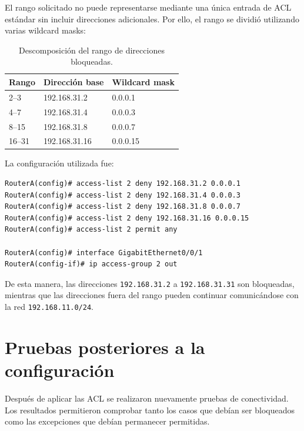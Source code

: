 \documentclass[12pt]{article}
\begin{document}
El rango solicitado no puede representarse mediante una única entrada de ACL
estándar sin incluir direcciones adicionales. Por ello, el rango se dividió
utilizando varias wildcard masks:

\begin{table}[H]
    \centering
    \caption{Descomposición del rango de direcciones bloqueadas.}
    \label{tab:rango}
    \small
    \begin{tabular}{lll}
        \toprule
        \textbf{Rango} & \textbf{Dirección base} & \textbf{Wildcard mask} \\
        \midrule
        2--3 & 192.168.31.2 & 0.0.0.1 \\
        4--7 & 192.168.31.4 & 0.0.0.3 \\
        8--15 & 192.168.31.8 & 0.0.0.7 \\
        16--31 & 192.168.31.16 & 0.0.0.15 \\
        \bottomrule
    \end{tabular}
\end{table}

La configuración utilizada fue:

\begin{verbatim}
RouterA(config)# access-list 2 deny 192.168.31.2 0.0.0.1
RouterA(config)# access-list 2 deny 192.168.31.4 0.0.0.3
RouterA(config)# access-list 2 deny 192.168.31.8 0.0.0.7
RouterA(config)# access-list 2 deny 192.168.31.16 0.0.0.15
RouterA(config)# access-list 2 permit any

RouterA(config)# interface GigabitEthernet0/0/1
RouterA(config-if)# ip access-group 2 out
\end{verbatim}

De esta manera, las direcciones \texttt{192.168.31.2} a
\texttt{192.168.31.31} son bloqueadas, mientras que las direcciones fuera
del rango pueden continuar comunicándose con la red
\texttt{192.168.11.0/24}.

\section{Pruebas posteriores a la configuración}

Después de aplicar las ACL se realizaron nuevamente pruebas de conectividad.
Los resultados permitieron comprobar tanto los casos que debían ser
bloqueados como las excepciones que debían permanecer permitidas.
\end{document}
